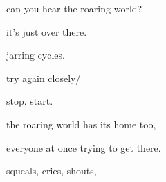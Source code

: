 \documentclass[extrafontsizes, 48pt]{memoir}
\newcommand\blankpage{%
    \null
    \thispagestyle{empty}%
    \addtocounter{page}{-1}%
    \newpage}
\begin{document}
	\begin{minipage}{.6\textwidth}
	can you hear the roaring world?
	\end{minipage}
	\newpage

	\begin{minipage}{.6\textwidth}
	it's just over there.
	\end{minipage}
	\newpage

	\begin{minipage}{.6\textwidth}
	jarring cycles.
	\end{minipage}
	\newpage

	\begin{minipage}{.6\textwidth}
	try again closely/ 
	\end{minipage}
	\newpage

	\begin{minipage}{.6\textwidth}
	stop. start.
	\afterpage{\blankpage}
	\end{minipage}
	\newpage

	\begin{minipage}{.6\textwidth}
	the roaring world has its home too,
	\end{minipage}
	\newpage

	\begin{minipage}{.6\textwidth}
	everyone at once trying to get there.
	\end{minipage}
	\newpage

	\begin{minipage}{.6\textwidth}
	squeals, cries, shouts,
	\end{minipage}
	\newpage
\end{document}
